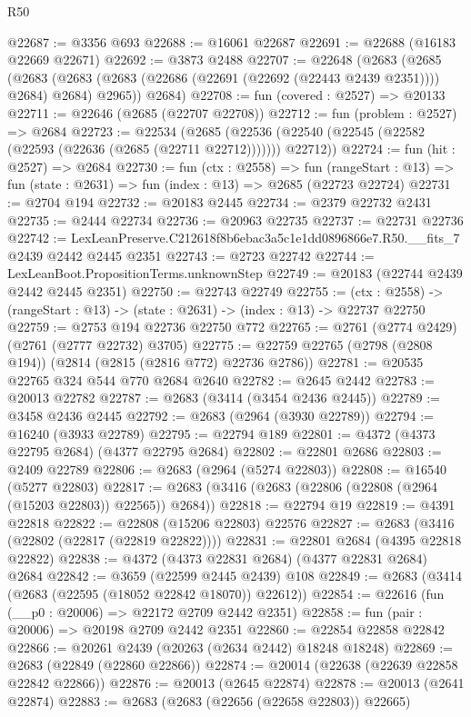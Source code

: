 \begin{lexlean}{R50}
\begin{coremodule}
@22687 := @3356 @693
@22688 := @16061 @22687
@22691 := @22688 (@16183 @22669 @22671)
@22692 := @3873 @2488
@22707 := @22648
    (@2683
      (@2685
        (@2683 (@2683 (@2683 (@22686 (@22691 (@22692 (@22443 @2439 @2351)))) @2684) @2684) @2965))
      @2684)
@22708 := fun (covered : @2527) => @20133
@22711 := @22646 (@2685 (@22707 @22708))
@22712 := fun (problem : @2527) => @2684
@22723 := @22534
    (@2685 (@22536 (@22540 (@22545 (@22582 (@22593 (@22636 (@2685 (@22711 @22712))))))) @22712))
@22724 := fun (hit : @2527) => @2684
@22730 := fun (ctx : @2558) =>
  fun (rangeStart : @13) => fun (state : @2631) => fun (index : @13) => @2685 (@22723 @22724)
@22731 := @2704 @194
@22732 := @20183 @2445
@22734 := @2379 @22732 @2431
@22735 := @2444 @22734
@22736 := @20963 @22735
@22737 := @22731 @22736
@22742 := LexLeanPreserve.C212618f8b6ebac3a5c1e1dd0896866e7.R50.__fits_7 @2439 @2442 @2445 @2351
@22743 := @2723 @22742
@22744 := LexLeanBoot.PropositionTerms.unknownStep
@22749 := @20183 (@22744 @2439 @2442 @2445 @2351)
@22750 := @22743 @22749
@22755 := (ctx : @2558) -> (rangeStart : @13) -> (state : @2631) -> (index : @13) -> @22737 @22750
@22759 := @2753 @194 @22736 @22750 @772
@22765 := @2761 (@2774 @2429) (@2761 (@2777 @22732) @3705)
@22775 := @22759 @22765 (@2798 (@2808 @194)) (@2814 (@2815 (@2816 @772) @22736 @2786))
@22781 := @20535 @22765 @324 @544 @770 @2684 @2640
@22782 := @2645 @2442
@22783 := @20013 @22782
@22787 := @2683 (@3414 (@3454 @2436 @2445))
@22789 := @3458 @2436 @2445
@22792 := @2683 (@2964 (@3930 @22789))
@22794 := @16240 (@3933 @22789)
@22795 := @22794 @189
@22801 := @4372 (@4373 @22795 @2684) (@4377 @22795 @2684)
@22802 := @22801 @2686
@22803 := @2409 @22789
@22806 := @2683 (@2964 (@5274 @22803))
@22808 := @16540 (@5277 @22803)
@22817 := @2683 (@3416 (@2683 (@22806 (@22808 (@2964 (@15203 @22803)) @22565)) @2684))
@22818 := @22794 @19
@22819 := @4391 @22818
@22822 := @22808 (@15206 @22803) @22576
@22827 := @2683 (@3416 (@22802 (@22817 (@22819 @22822))))
@22831 := @22801 @2684 (@4395 @22818 @22822)
@22838 := @4372 (@4373 @22831 @2684) (@4377 @22831 @2684) @2684
@22842 := @3659 (@22599 @2445 @2439) @108
@22849 := @2683 (@3414 (@2683 (@22595 (@18052 @22842 @18070)) @22612))
@22854 := @22616 (fun (__p0 : @20006) => @22172 @2709 @2442 @2351)
@22858 := fun (pair : @20006) => @20198 @2709 @2442 @2351
@22860 := @22854 @22858 @22842
@22866 := @20261 @2439 (@20263 (@2634 @2442) @18248 @18248)
@22869 := @2683 (@22849 (@22860 @22866))
@22874 := @20014 (@22638 (@22639 @22858 @22842 @22866))
@22876 := @20013 (@2645 @22874)
@22878 := @20013 (@2641 @22874)
@22883 := @2683 (@2683 (@22656 (@22658 @22803)) @22665)

\end{coremodule}
\end{lexlean}
